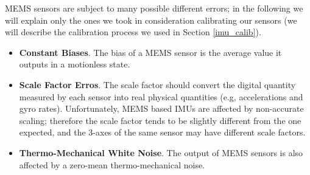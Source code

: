 MEMS sensors are subject to many possible different errors; in the following we will explain only the ones we took in consideration calibrating our sensors (we will describe the calibration process we used in Section \ref{imu_calib}).
\begin{itemize}
	\item \textbf{Constant Biases}. The bias of a MEMS sensor is the average value it outputs in a motionless state.
	\item \textbf{Scale Factor Erros}. The scale factor should convert the digital quantity measured by each sensor into real physical quantities (e.g, accelerations and gyro rates). Unfortunately, MEMS based IMUs are affected by non-accurate scaling; therefore the scale factor tends to be slightly different from the one expected, and the 3-axes of the same sensor may have different scale factors.
	\item \textbf{Thermo-Mechanical White Noise}. The output of MEMS sensors is also affected by a zero-mean thermo-mechanical noise.
\end{itemize}
